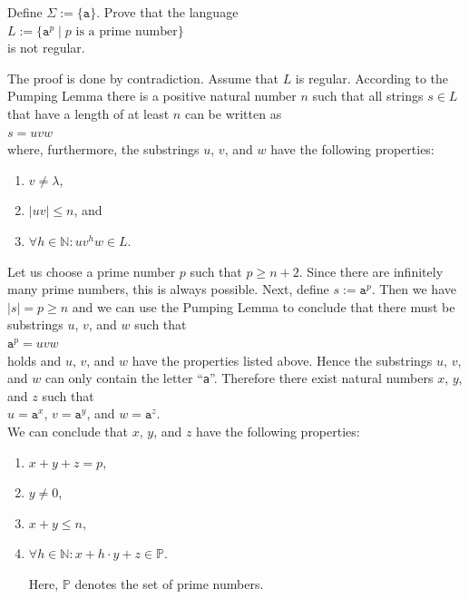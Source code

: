 \exerciseEng
Define $\Sigma := \{\mathtt{a}\}$.  
Prove that the language
\\[0.2cm]
\hspace*{1.3cm}
$L := \bigl\{ \mathtt{a}^p \mid \mbox{$p$ is a prime number} \bigr\}$
\\[0.2cm]
is not regular.  \eox
\vspace{0.3cm}

\solutionEng
The proof is done by contradiction.  Assume that $L$ is regular.  According to the Pumping Lemma there is a
positive natural number $n$ such that all strings $s \in L$ that have a length of at least $n$ can be written as
\\[0.2cm]
\hspace*{1.3cm}
$s = uvw$
\\[0.2cm]
where, furthermore, the substrings $u$, $v$, and $w$ have the following properties:
\begin{enumerate}
\item $v \not= \lambda$, 
\item $|uv| \leq n$, \quad and
\item $\forall h \in \mathbb{N}: u v^h w \in L$.
\end{enumerate}
Let us choose a prime number $p$ such that $p \geq n + 2$.
Since there are infinitely many prime numbers, this
is always possible.  Next,  define $s := \mathtt{a}^p$.
Then we have $|s| = p \geq n$ and we can use the Pumping Lemma to conclude that there must be substrings $u$,
$v$, and $w$ such that
\\[0.2cm]
\hspace*{1.3cm}
$\mathtt{a}^p = uvw$ 
\\[0.2cm]
holds and $u$, $v$, and $w$ have the properties listed above.
Hence the substrings $u$, $v$, and $w$ can only contain the letter ``\texttt{a}''.  Therefore there exist
natural numbers $x$, $y$, and $z$ such that
\\[0.2cm]
\hspace*{1.3cm}
$u = \mathtt{a}^x$, \quad $v = \mathtt{a}^y$, \quad and \quad $w = \mathtt{a}^z$.
\\[0.2cm]
We can conclude that  $x$, $y$, and $z$ have the following properties:
\begin{enumerate}
\item $x + y + z = p$,
\item $y \not= 0$,
\item $x + y \leq n$,
\item $\forall h \in \mathbb{N}: x + h \cdot y + z \in \mathbb{P}$.

      Here, $\mathbb{P}$ denotes the set of prime numbers.
\end{enumerate}

